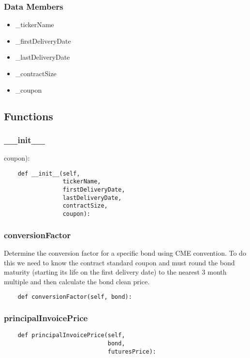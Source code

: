 \documentclass[twoside,11pt]{book}
\begin{document}
\subsubsection*{Data Members}
\begin{itemize}
\item{\_tickerName}
\item{\_firstDeliveryDate}
\item{\_lastDeliveryDate}
\item{\_contractSize}
\item{\_coupon}
\end{itemize}

\subsection*{Functions}

\subsubsection*{{\bf \_\_init\_\_}}
coupon): 

\begin{lstlisting}
    def __init__(self,
                 tickerName,
                 firstDeliveryDate,
                 lastDeliveryDate,
                 contractSize,
                 coupon):
\end{lstlisting}

\subsubsection*{{\bf conversionFactor}}
Determine the conversion factor for a specific bond using CME convention. To do this we need to know the contract standard coupon and must round the bond maturity (starting its life on the first delivery date) to the nearest 3 month multiple and then calculate the bond clean price.  

\begin{lstlisting}
    def conversionFactor(self, bond):
\end{lstlisting}

\subsubsection*{{\bf principalInvoicePrice}}


\begin{lstlisting}
    def principalInvoicePrice(self,
                              bond,
                              futuresPrice):
\end{lstlisting}
\end{document}
